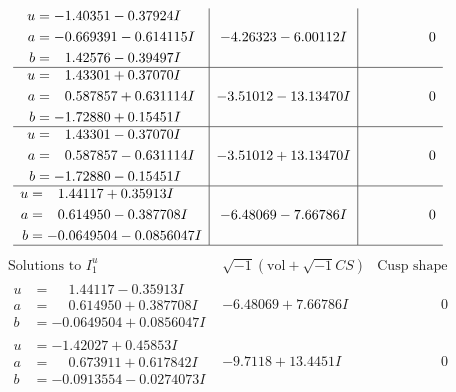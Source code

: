 \documentclass[1p]{elsarticle_modified}
\theoremstyle{definition}
\newcommand{\I}{\sqrt{-1}}
\begin{document}
$$\begin{array}{c|c|c}
\begin{aligned}
u &= -1.40351 - 0.37924 I \\
a &= -0.669391 - 0.614115 I \\
b &= \phantom{-}1.42576 - 0.39497 I\end{aligned}
 & -4.26323 - 6.00112 I & \phantom{-0.000000 } 0 \\ \hline\begin{aligned}
u &= \phantom{-}1.43301 + 0.37070 I \\
a &= \phantom{-}0.587857 + 0.631114 I \\
b &= -1.72880 + 0.15451 I\end{aligned}
 & -3.51012 - 13.13470 I & \phantom{-0.000000 } 0 \\ \hline\begin{aligned}
u &= \phantom{-}1.43301 - 0.37070 I \\
a &= \phantom{-}0.587857 - 0.631114 I \\
b &= -1.72880 - 0.15451 I\end{aligned}
 & -3.51012 + 13.13470 I & \phantom{-0.000000 } 0 \\ \hline\begin{aligned}
u &= \phantom{-}1.44117 + 0.35913 I \\
a &= \phantom{-}0.614950 - 0.387708 I \\
b &= -0.0649504 - 0.0856047 I\end{aligned}
 & -6.48069 - 7.66786 I & \phantom{-0.000000 } 0\\
 \hline 
 \end{array}$$\newpage$$\begin{array}{c|c|c}  
\text{Solutions to }I^u_{1}& \I (\text{vol} + \sqrt{-1}CS) & \text{Cusp shape}\\
 \hline 
\begin{aligned}
u &= \phantom{-}1.44117 - 0.35913 I \\
a &= \phantom{-}0.614950 + 0.387708 I \\
b &= -0.0649504 + 0.0856047 I\end{aligned}
 & -6.48069 + 7.66786 I & \phantom{-0.000000 } 0 \\ \hline\begin{aligned}
u &= -1.42027 + 0.45853 I \\
a &= \phantom{-}0.673911 + 0.617842 I \\
b &= -0.0913554 - 0.0274073 I\end{aligned}
 & -9.7118 + 13.4451 I & \phantom{-0.000000 } 0 \\ \hline\begin{aligned}

\end{aligned}
\end{array}$$
\end{document}
